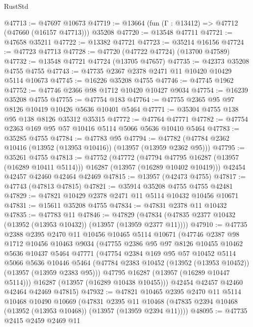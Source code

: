 \begin{lexlean}{RustStd}
\begin{coremodule}
@47713 := @47697 @10673
@47719 := @13664 (fun (Γ : @13412) => @47712 (@47660 (@16157 @47713))) @35208
@47720 := @13548 @47711
@47721 := @47658 @35211
@47722 := @13382 @47721
@47723 := @35214 @16156
@47724 := @47723 @47713
@47728 := @47720 (@47722 @47724) (@13700 @47589)
@47732 := @13548 @47721 @47724 (@13705 @47657)
@47735 := @42373 @35208 @4755 @4755
@47743 := @47735 @2367 @2378 @2471 @11 @10420 @10429 @5114 @10673
@47745 := @16226 @35208 @4755
@47746 := @47745 @1962
@47752 := @47746 @2366 @98 @1712 @10420 @10427 @9034
@47754 := @16239 @35208 @4755
@47755 := @47754 @183
@47764 := @47755 @2365 @95 @97 @8126 @10419 @10426 @5636 @10401 @5464
@47771 := @35304 @4755 @138 @95 @138 @8126 @35312 @35315
@47772 := @47764 @47771
@47782 := @47754 @2363 @169 @95 @57 @10416 @5114 @5066 @5636 @10410 @5464
@47783 := @35285 @4755
@47784 := @47783 @95
@47794 := @47782 (@47784 @2362 @10416 (@13952 (@13953 @10416)) (@13957 (@13959 @2362 @95)))
@47795 := @35261 @4755
@47813 := @47752
    (@47772
      (@47794 @47795 @16287 (@13957 (@16289 @10411 @5114)))
      @16287
      (@13957 (@16289 @10402 @10419)))
    @42454
    @42457
    @42460
    @42464
    @42469
@47815 := @13957 (@42473 @4755)
@47817 := @47743 (@47813 @47815)
@47821 := @35914 @35208 @4755 @4755 @42481
@47829 := @47821 @10429 @2378 @2471 @11 @5114 @10432 @10456 @10671
@47831 := @15611 @35208 @4755
@47834 := @47831 @2378 @11 @10432
@47835 := @47783 @11
@47846 := @47829 (@47834 (@47835 @2377 @10432 (@13952 (@13953 @10432)) (@13957 (@13959 @2377 @11))))
@47910 := @47735
    @2388
    @2395
    @2470
    @11
    @10456
    @10465
    @5114
    @10671
    (@47746
      @2387
      @98
      @1712
      @10456
      @10463
      @9034
      (@47755
        @2386
        @95
        @97
        @8126
        @10455
        @10462
        @5636
        @10437
        @5464
        @47771
        (@47754
          @2384
          @169
          @95
          @57
          @10452
          @5114
          @5066
          @5636
          @10446
          @5464
          (@47784 @2383 @10452 (@13952 (@13953 @10452)) (@13957 (@13959 @2383 @95)))
          @47795
          @16287
          (@13957 (@16289 @10447 @5114)))
        @16287
        (@13957 (@16289 @10438 @10455)))
      @42454
      @42457
      @42460
      @42464
      @42469
      @47815)
@47932 := @47821
    @10465
    @2395
    @2470
    @11
    @5114
    @10468
    @10490
    @10669
    (@47831
      @2395
      @11
      @10468
      (@47835 @2394 @10468 (@13952 (@13953 @10468)) (@13957 (@13959 @2394 @11))))
@48095 := @47735
    @2415
    @2459
    @2469
    @11

\end{coremodule}
\end{lexlean}
